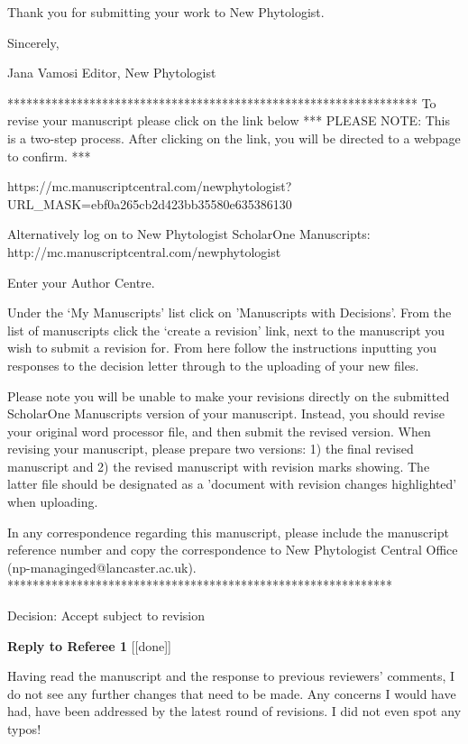 \documentclass[12pt]{letter}
\newenvironment{refquote}{\bigskip \begin{it}}{\end{it}\smallskip}
\begin{document}
Thank you for submitting your work to New Phytologist.

Sincerely,

Jana Vamosi
Editor, New Phytologist

*****************************************************************
To revise your manuscript please click on the link below
*** PLEASE NOTE: This is a two-step process. After clicking on the link, you will be directed to a webpage to confirm. ***

https://mc.manuscriptcentral.com/newphytologist?URL_MASK=ebf0a265cb2d423bb35580e635386130

Alternatively log on to New Phytologist ScholarOne Manuscripts:
http://mc.manuscriptcentral.com/newphytologist

Enter your Author Centre.

Under the ‘My Manuscripts' list click on 'Manuscripts with Decisions'. From the list of manuscripts click the ‘create a revision' link, next to the manuscript you wish to submit a revision for. From here follow the instructions inputting you responses to the decision letter through to the uploading of your new files.

Please note you will be unable to make your revisions directly on the submitted ScholarOne Manuscripts version of your manuscript. Instead, you should revise your original word processor file, and then submit the revised version. When revising your manuscript, please prepare two versions: 1) the final revised manuscript and 2) the revised manuscript with revision marks showing. The latter file should be designated as a 'document with revision changes highlighted' when uploading.

In any correspondence regarding this manuscript, please include the manuscript reference number and copy the correspondence to New Phytologist Central Office (np-managinged@lancaster.ac.uk).
*************************************************************


Decision: Accept subject to revision

\clearpage

{\Large \bf Reply to Referee 1} [[done]]

	\begin{refquote}
	Having read the manuscript and the response to previous reviewers’ comments, I do not see any further changes that need to be made. Any concerns I would have had, have been addressed by the latest round of revisions. I did not even spot any typos!
	\end{refquote}
\end{document}
